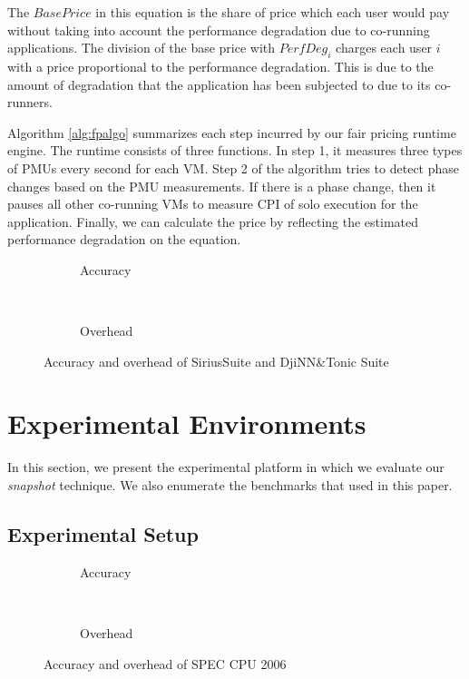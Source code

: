 \documentclass{sig-alternate}
\begin{document}
The $BasePrice$ in this equation is the share of price which each user would pay without taking into account the performance degradation due to co-running applications. The division of the base price with $PerfDeg_{i}$ charges each user $i$ with a price proportional to the performance degradation. This is due to the amount of degradation that the application has been subjected to due to its co-runners.

Algorithm \ref{alg:fpalgo} summarizes each step incurred by our fair pricing runtime engine. The runtime consists of three functions. In step 1, it measures three types of PMUs every second for each VM. Step 2 of the algorithm tries to detect phase changes based on the PMU measurements. If there is a phase change, then it pauses all other co-running VMs to measure CPI of solo execution for the application. Finally, we can calculate the price by reflecting the estimated performance degradation on the equation.
\begin{figure}
\centering
\begin{subfigure}[t]{1\columnwidth}
\centering
{}
\caption{Accuracy}
\label{fig:sirius-accuracy}
\end{subfigure}
\hfill\\
\begin{subfigure}[t]{1\columnwidth}
\centering
{}
\caption{Overhead}
\label{fig:sirius-overhead}
\end{subfigure}
\caption{Accuracy and overhead of SiriusSuite and DjiNN\&Tonic Suite\vspace{-0.2in}}
\label{fig:sirius-acc-over}
\end{figure}
\section{Experimental Environments}
\label{sec:ExperimentalEnvironments}

In this section, we present the experimental platform in which we evaluate our \textit{snapshot} technique. We also enumerate the benchmarks that used in this paper.
\subsection{Experimental Setup}
\label{subsec:ExperimentalSetup}
\begin{figure*}
\centering
\begin{subfigure}[t]{2\columnwidth}
\centering
{}
\caption{Accuracy}
\label{fig:spec-accuracy}
\end{subfigure}
\hfill\\
\begin{subfigure}[t]{2\columnwidth}
\centering
{}
\caption{Overhead}
\label{fig:spec-overhead}
\end{subfigure}
\caption{Accuracy and overhead of SPEC CPU 2006}
\label{fig:spec-acc-over}
\end{figure*}
\end{document}
